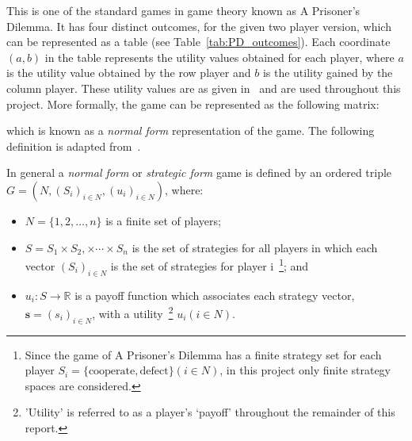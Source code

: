 This is one of the standard games in game theory known as A Prisoner's Dilemma.
It has four distinct outcomes, for the given two player version, which can be
represented as a table (see Table~\ref{tab:PD_outcomes}).
Each coordinate \((a, b)\) in the table represents the utility values obtained
for each player, where \(a\) is the utility value obtained by the row player
and \(b\) is the utility gained by the column player. These utility values are
as given in~\cite{axelrod1980effective} and are used throughout this project.
More formally, the game can be represented as the following matrix:

\label{PDMatrix}

which is known as a \emph{normal form} representation of the game. The following
definition is adapted from~\cite{maschler_solan_zamir_2013}.

In general a \textit{normal form} or \textit{strategic form} game is defined by
an ordered triple \(G = (N, (S_i)_{i \in N}, (u_i)_{i \in N})\), where:
\begin{itemize}
    \item \(N = \{1, 2,\ldots, n\} \) is a finite set of players;
    \item \(S = S_1 \times S_2, \times \cdots \times S_n\) is the set of
    strategies for all players in which each vector \((S_i)_{i \in N}\) is the
    set of strategies for player i~\footnote{Since the game of A Prisoner's
    Dilemma has a finite strategy set for each player \(S_i = \{
    \text{cooperate}, \text{defect}\} (i \in N)\), in this project only finite
    strategy spaces are considered.}; and
    \item \(u_i : S \to \mathbb{R}\) is a payoff function which associates each
    strategy vector, \(\textbf{s} = (s_i)_{i \in N}\), with a utility~\footnote{'Utility' is referred to as a player's `payoff' throughout the
    remainder of this report.} \(u_i(i \in N)\).
\end{itemize}

